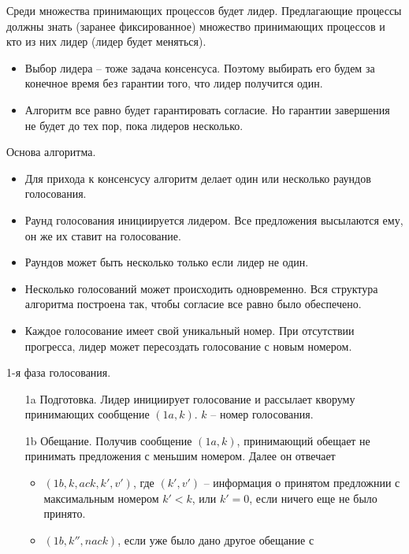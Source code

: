 \begin{algorithm}
\begin{itemize}
    \end{itemize}
    Среди множества принимающих процессов будет лидер. Предлагающие процессы
    должны знать (заранее фиксированное) множество принимающих процессов
    и кто из них лидер (лидер будет меняться).
    \begin{itemize}
        \item Выбор лидера -- тоже задача консенсуса. Поэтому выбирать его
            будем за конечное время без гарантии того, что лидер получится один.
        \item Алгоритм все равно будет гарантировать согласие. Но гарантии завершения
            не будет до тех пор, пока лидеров несколько.
    \end{itemize}
    Основа алгоритма.
    \begin{itemize}
        \item Для прихода к консенсусу алгоритм делает один или несколько
            раундов голосования.
        \item Раунд голосования инициируется лидером. Все предложения высылаются
            ему, он же их ставит на голосование.
        \item Раундов может быть несколько только если лидер не один.
        \item Несколько голосований может происходить одновременно. Вся структура
            алгоритма построена так, чтобы согласие все равно было обеспечено.
        \item Каждое голосование имеет свой уникальный номер. При отсутствии прогресса,
            лидер может пересоздать голосование с новым номером.
    \end{itemize}
    1-я фаза голосования.
    \begin{itemize}
        \item[1a] Подготовка. Лидер инициирует голосование и рассылает кворуму
            принимающих сообщение $(1a, k)$. $k$ -- номер голосования.
        \item[1b] Обещание. Получив сообщение $(1a, k)$, принимающий обещает
            не принимать предложения с меньшим номером. Далее он отвечает
            \begin{itemize}
                \item $(1b, k, ack, k', v')$, где $(k', v')$ -- информация
                    о принятом предложнии с максимальным номером $k' < k$,
                    или $k' = 0$, если ничего еще не было принято.
                \item $(1b, k'', nack)$, если уже было дано другое обещание с

\end{itemize}
\end{itemize}
\end{algorithm}
